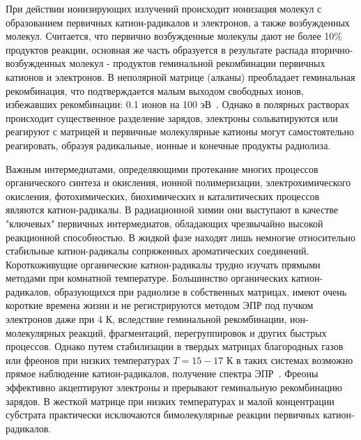 \documentclass[14pt,titlepage]{extarticle}
\begin{document}
При действии ионизирующих излучений происходит ионизация молекул с образованием первичных катион-радикалов и электронов, а также возбужденных молекул. Считается, что первично возбужденные молекулы дают не более 10\% продуктов реакции, основная же часть образуется в результате распада вторично-возбужденных молекул - продуктов геминальной рекомбинации первичных катионов и электронов. В неполярной матрице (алканы) преобладает геминальная рекомбинация, что подтверждается малым выходом свободных ионов, избежавших рекомбинации: 0.1 ионов на 100 эВ~\cite{IonProc}. Однако в полярных растворах происходит существенное разделение зарядов, электроны сольватируются или реагируют с матрицей и первичные молекулярные катионы могут самостоятельно реагировать, образуя радикальные, ионные и конечные продукты радиолиза.

Важным интермедиатами, определяющими протекание многих процессов органического синтеза и окисления, ионной полимеризации, электрохимического окисления, фотохимических, биохимических и каталитических процессов являются катион-радикалы. В радиационной химии они выступают в качестве "ключевых" первичных интермедиатов, обладающих чрезвычайно высокой реакционной способностью. В жидкой фазе находят лишь немногие относительно стабильные катион-радикалы сопряженных ароматических соединений. Короткоживущие органические катион-радикалы трудно изучать прямыми методами при комнатной температуре. Большинство органических катион-радикалов, образующихся при радиолизе в собственных матрицах, имеют очень короткие времена жизни и не регистрируются методом ЭПР под пучком электронов даже при 4 К, вследствие геминальной рекомбинации, ион-молекулярных реакций, фрагментаций, перегруппировок и других быстрых процессов. Однако путем стабилизации в твердых матрицах благородных газов или фреонов при низких температурах \(T=15-17\) К в таких системах возможно прямое наблюдение катион-радикалов, получение спектра ЭПР~\cite{feldman}. Фреоны эффективно акцептируют электроны и прерывают геминальную рекомбинацию зарядов. В жесткой матрице при низких температурах и малой концентрации субстрата практически исключаются бимолекулярные реакции первичных катион-радикалов.
\end{document}
